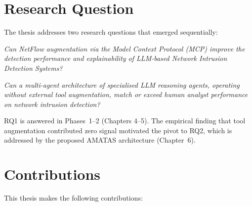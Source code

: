 \documentclass[12pt, a4paper, oneside]{report}
\begin{document}
\section{Research Question}
\label{sec:research-question}

The thesis addresses two research questions that emerged sequentially:

\begin{description}[style=nextline, leftmargin=2em]
  \item[RQ1 (Phases 1--2):] \emph{Can NetFlow augmentation via the Model Context
    Protocol (MCP) improve the detection performance and explainability of
    LLM-based Network Intrusion Detection Systems?}
  \item[RQ2 (Phase 3):] \emph{Can a multi-agent architecture of specialised LLM
    reasoning agents, operating without external tool augmentation, match or
    exceed human analyst performance on network intrusion detection?}
\end{description}

\noindent RQ1 is answered in Phases~1--2 (Chapters 4--5). The empirical finding
that tool augmentation contributed zero signal motivated the pivot to RQ2, which
is addressed by the proposed AMATAS architecture (Chapter~6).

\section{Contributions}
\label{sec:contributions}

This thesis makes the following contributions:
\end{document}
